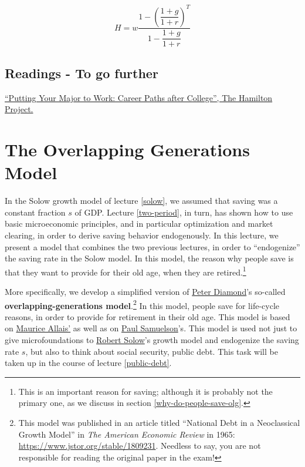 \documentclass[]{book}
\let\rmarkdownfootnote\footnote%
\def\footnote{\protect\rmarkdownfootnote}
\begin{document}
\[H =w\frac{1-\left(\dfrac{1+g}{1+r}\right)^{T}}{1-\dfrac{1+g}{1+r}}\]

\section*{Readings - To go further}\label{readings---to-go-further-2}

\href{http://www.hamiltonproject.org/charts/median_earnings_for_largest_occupations}{``Putting
Your Major to Work: Career Paths after College'', The Hamilton Project.}

\hypertarget{olg}{\chapter{The Overlapping Generations
Model}\label{olg}}

In the Solow growth model of lecture \ref{solow}, we assumed that saving
was a constant fraction \(s\) of GDP. Lecture \ref{two-period}, in turn,
has shown how to use basic microeconomic principles, and in particular
optimization and market clearing, in order to derive saving behavior
endogenously. In this lecture, we present a model that combines the two
previous lectures, in order to ``endogenize'' the saving rate in the
Solow model. In this model, the reason why people save is that they want
to provide for their old age, when they are retired.\footnote{This is an
  important reason for saving; although it is probably not the primary
  one, as we discuss in section \ref{why-do-people-save-olg}.}

More specifically, we develop a simplified version of
\href{https://en.wikipedia.org/wiki/Peter_Diamond}{Peter Diamond}'s
so-called \textbf{overlapping-generations model}.\footnote{This model
  was published in an article titled ``National Debt in a Neoclassical
  Growth Model'' in \emph{The American Economic Review} in 1965:
  \url{https://www.jstor.org/stable/1809231}. Needless to say, you are
  not responsible for reading the original paper in the exam!} In this
model, people save for life-cycle reasons, in order to provide for
retirement in their old age. This model is based on
\href{https://en.wikipedia.org/wiki/Maurice_Allais}{Maurice Allais'} as
well as on \href{https://en.wikipedia.org/wiki/Paul_Samuelson}{Paul
Samuelson}'s. This model is used not just to give microfoundations to
\href{https://en.wikipedia.org/wiki/Robert_Solow}{Robert Solow}'s growth
model and endogenize the saving rate \(s\), but also to think about
social security, public debt. This task will be taken up in the course
of lecture \ref{public-debt}.
\end{document}
